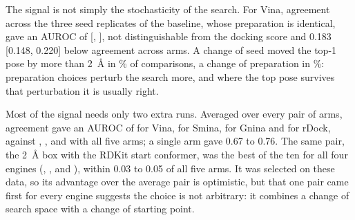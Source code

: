 The signal is not simply the stochasticity of the search. For Vina, agreement across the
three seed replicates of the baseline, whose preparation is identical, gave an AUROC of
 [, ], not distinguishable from the docking score and 0.183 [0.148, 0.220]
below agreement across arms. A change of seed moved the top-1 pose by more than
\SI{2}{\angstrom} in \% of comparisons, a change of preparation in \%: preparation
choices perturb the search more, and where the top pose survives that perturbation it is
usually right.

Most of the signal needs only two extra runs. Averaged over every pair of arms, agreement
gave an AUROC of  for Vina,  for Smina,  for Gnina and  for rDock,
against , ,  and  with all five arms; a single arm gave 0.67 to 0.76.
The same pair, the \SI{2}{\angstrom} box with the RDKit start conformer, was the best of the
ten for all four engines (, ,  and ), within 0.03 to 0.05 of all five
arms. It was selected on these data, so its advantage over the average pair is optimistic,
but that one pair came first for every engine suggests the choice is not arbitrary: it
combines a change of search space with a change of starting point.

